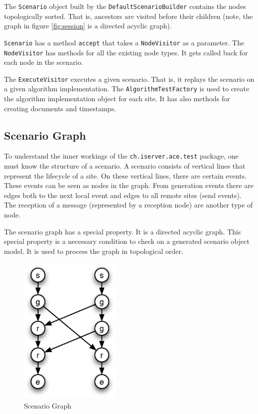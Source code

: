 \documentclass[11pt,a4paper]{article}
\begin{document}
The \texttt{Scenario} object built by the \texttt{DefaultScenarioBuilder} contains the nodes topologically sorted. That is, ancestors are visited before their children (note, the graph in figure \ref{fig:session} is a directed acyclic graph). 

\texttt{Scenario} has a method \texttt{accept} that takes a \texttt{NodeVisitor} as a parameter. The \texttt{NodeVisitor} has methods for all the existing node types. It gets called back for each node in the scenario. 

The \texttt{ExecuteVisitor} executes a given scenario. That is, it replays the scenario on a given algorithm implementation. The \texttt{AlgorithmTestFactory} is used to create the algorithm implementation object for each site. It has also methods for creating documents and timestamps.


\subsection{Scenario Graph}
To understand the inner workings of the \texttt{ch.iserver.ace.test} package, one must know the structure of a scenario. A scenario consists of vertical lines that represent the lifecycle of a site. On these vertical lines, there are certain events. These events can be seen as nodes in the graph. From generation events there are edges both to the next local event and edges to all remote sites (send events). The reception of a message (represented by a reception node) are another type of node.

The scenario graph has a special property. It is a directed acyclic graph. This special property is a necessary condition to check on a generated scenario object model. It is used to process the graph in topological order.

\begin{figure}[H]
 \centering
 \includegraphics[width=4.9cm,height=7.2cm]{../../images/testframework.eps}
 \caption{Scenario Graph}
 \label{fig:graph}
\end{figure}
\end{document}
